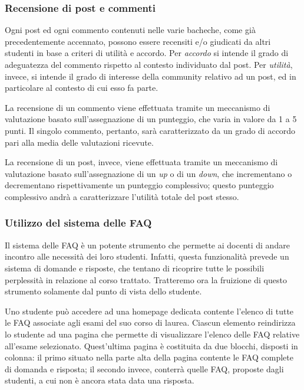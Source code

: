 \documentclass [a4paper,11pt]{book}
\begin{document}
\medskip

\subsubsection{Recensione di post e commenti}

Ogni post ed ogni commento contenuti nelle varie bacheche, come già precedentemente accennato, possono essere recensiti e/o giudicati da altri studenti in base a criteri di utilità e accordo. Per \emph{accordo} si intende il grado di adeguatezza del commento rispetto al contesto individuato dal post. Per \emph{utilità}, invece, si intende il grado di interesse della community relativo ad un post, ed in particolare al contesto di cui esso fa parte.

La recensione di un commento viene effettuata tramite un meccanismo di valutazione basato sull'assegnazione di un punteggio, che varia in valore da 1 a 5 punti. Il singolo commento, pertanto, sarà caratterizzato da un grado di accordo pari alla media delle valutazioni ricevute.

La recensione di un post, invece, viene effettuata tramite un meccanismo di valutazione basato sull'assegnazione di un \emph{up} o di un \emph{down}, che incrementano o decrementano rispettivamente un punteggio complessivo; questo punteggio complessivo andrà a caratterizzare l'utilità totale del post stesso.

\medskip

\subsubsection{Utilizzo del sistema delle FAQ}

Il sistema delle FAQ è un potente strumento che permette ai docenti di andare incontro alle necessità dei loro studenti. Infatti, questa funzionalità prevede un sistema di domande e risposte, che tentano di ricoprire tutte le possibili perplessità in relazione al corso trattato. Tratteremo ora la fruizione di questo strumento solamente dal punto di vista dello studente.

Uno studente può accedere ad una homepage dedicata contente l'elenco di tutte le FAQ associate agli esami del suo corso di laurea. Ciascun elemento reindirizza lo studente ad una pagina che permette di visualizzare l'elenco delle FAQ relative all'esame selezionato. Quest'ultima pagina è costituita da due blocchi, disposti in colonna: il primo situato nella parte alta della pagina contente le FAQ complete di domanda e risposta; il secondo invece, conterrà quelle FAQ, proposte dagli studenti, a cui non è ancora stata data una risposta.
\end{document}
